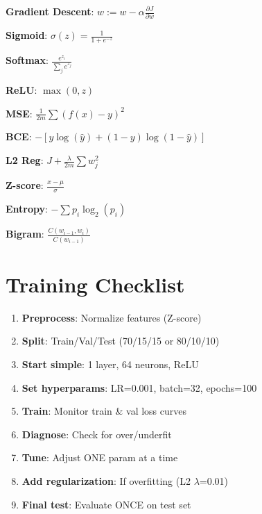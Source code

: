 \documentclass[11pt,a4paper]{article}
\begin{document}
\begin{definitionbox}

\textbf{Gradient Descent}: $w := w - \alpha \frac{\partial J}{\partial w}$

\textbf{Sigmoid}: $\sigma(z) = \frac{1}{1 + e^{-z}}$

\textbf{Softmax}: $\frac{e^{z_i}}{\sum_j e^{z_j}}$

\textbf{ReLU}: $\max(0, z)$

\textbf{MSE}: $\frac{1}{2m}\sum(f(x) - y)^2$

\textbf{BCE}: $-[y\log(\hat{y}) + (1-y)\log(1-\hat{y})]$

\textbf{L2 Reg}: $J + \frac{\lambda}{2m}\sum w_j^2$

\textbf{Z-score}: $\frac{x - \mu}{\sigma}$

\textbf{Entropy}: $-\sum p_i \log_2(p_i)$

\textbf{Bigram}: $\frac{C(w_{i-1}, w_i)}{C(w_{i-1})}$
\end{definitionbox}

\section{Training Checklist}

\begin{examplebox}

\begin{enumerate}[leftmargin=*,nosep]
\item \textbf{Preprocess}: Normalize features (Z-score)
\item \textbf{Split}: Train/Val/Test (70/15/15 or 80/10/10)
\item \textbf{Start simple}: 1 layer, 64 neurons, ReLU
\item \textbf{Set hyperparams}: LR=0.001, batch=32, epochs=100
\item \textbf{Train}: Monitor train \& val loss curves
\item \textbf{Diagnose}: Check for over/underfit
\item \textbf{Tune}: Adjust ONE param at a time
\item \textbf{Add regularization}: If overfitting (L2 $\lambda$=0.01)
\item \textbf{Final test}: Evaluate ONCE on test set
\end{enumerate}
\end{examplebox}
\end{document}
